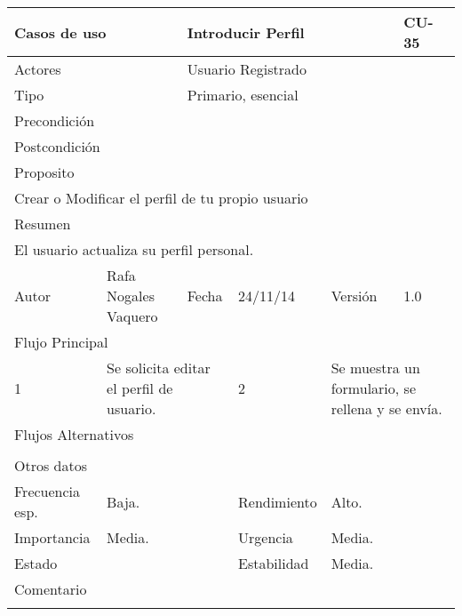 \documentclass{article}
\begin{document}
\clearpage

\begin{table}[h]
\begin{tabular}{|l|l|l|l|l|l|}
\hline
\multicolumn{2}{|p{2cm}|}{Casos de uso}  & \multicolumn{3}{p{7cm}|}{Introducir Perfil} & CU-35 \\
\hline
\multicolumn{2}{|p{2cm}|}{Actores}       & \multicolumn{4}{p{8cm}|}{Usuario Registrado}        \\
\hline
\multicolumn{2}{|p{2cm}|}{Tipo}          & \multicolumn{4}{p{8cm}|}{Primario, esencial}        \\
\hline
\multicolumn{2}{|p{2cm}|}{Precondición}  & \multicolumn{4}{p{8cm}|}{}        \\
\hline
\multicolumn{2}{|p{2cm}|}{Postcondición} & \multicolumn{4}{p{8cm}|}{}        \\
\hline
\multicolumn{6}{|p{10cm}|}{Proposito}                                   \\
\hline
\multicolumn{6}{|p{10cm}|}{Crear o Modificar el perfil de tu propio usuario}                                            \\
\hline
\multicolumn{6}{|p{10cm}|}{Resumen}                                 \\
\hline
\multicolumn{6}{|p{10cm}|}{El usuario actualiza su perfil personal.}                                            \\
\hline
Autor         &       Rafa Nogales Vaquero        &  Fecha   &  24/11/14   &   Versión  & 1.0\\
\hline
\multicolumn{6}{|p{10cm}|}{Flujo Principal}\\
\hline
\multicolumn{1}{|p{1cm}|}{1} & \multicolumn{2}{p{3cm}}{Se solicita editar el perfil de usuario.} & \multicolumn{1}{|p{1cm}|}{2} & \multicolumn{2}{p{3cm}|}{Se muestra un formulario, se rellena y se envía.}\\
\hline
\multicolumn{6}{|p{10cm}|}{Flujos Alternativos}\\
\hline
\multicolumn{1}{|p{1cm}}{} & \multicolumn{5}{|p{9cm}|}{}\\
\hline
\multicolumn{6}{|p{10cm}|}{Otros datos}\\
\hline
\multicolumn{1}{|p{2cm}|}{Frecuencia esp.} & \multicolumn{2}{p{3cm}}{Baja.} & \multicolumn{1}{|p{2cm}|}{Rendimiento} & \multicolumn{2}{p{3cm}|}{Alto.}\\
\hline
\multicolumn{1}{|p{2cm}|}{Importancia} & \multicolumn{2}{p{3cm}}{Media.} & \multicolumn{1}{|p{2cm}|}{Urgencia} & \multicolumn{2}{p{3cm}|}{Media.}\\
\hline
\multicolumn{1}{|p{2cm}|}{Estado} & \multicolumn{2}{p{3cm}}{} & \multicolumn{1}{|p{2cm}|}{Estabilidad} & \multicolumn{2}{p{3cm}|}{Media.}\\
\hline
\multicolumn{6}{|p{10cm}|}{Comentario}\\
\hline
\multicolumn{6}{|p{10cm}|}{}\\
\hline
\end{tabular}
\end{table}
\end{document}
